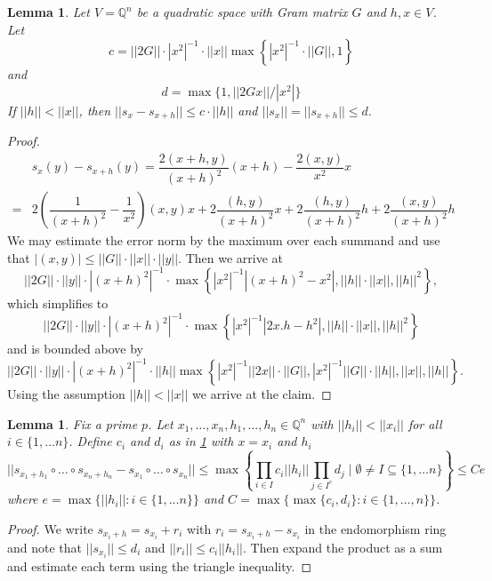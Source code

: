 \documentclass[11pt,letterpaper]{amsart}
\newcommand{\QQ}{\mathbb{Q}}
\newtheorem{lemma}[theorem]{Lemma}
\theoremstyle{definition}
\theoremstyle{remark}
\begin{document}
\begin{lemma}\label{lem:error}
Let $V=\QQ^n$ be a quadratic space with Gram matrix $G$ and $h,x \in V$.
Let
\[ c = ||2G|| \cdot  |x^2|^{-1} \cdot ||x|| \max \left\{ |x^2|^{-1} \cdot ||G||, 1\right\}\]
and 
\[d = \max\{1,  ||2 G x|| /|x^2|\}\]
If $||h|| < ||x||$, then 
$ || s_x - s_{x+h}|| \leq c \cdot ||h||$
and 
\(||s_x|| = ||s_{x+h}|| \leq d. \)
\end{lemma}
\begin{proof}
\[\begin{array}{ll}
    & s_{x}(y) - s_{x+h}(y) = \dfrac{2 (x+h,y)}{(x+h)^2}(x+h) - \dfrac{2 (x,y)}{x^2}x\\[15pt]
    =& 2\left(\dfrac{1}{(x+h)^2}-\dfrac{1}{x^2} \right)(x,y) x
     + 2\dfrac{(h,y)}{(x+h)^2}x    + 2\dfrac{(h,y)}{(x+h)^2}h
     + 2\dfrac{(x,y)}{(x+h)^2}h 
\end{array}\]
We may estimate the error norm by the maximum over each summand and use that $|(x,y)|\leq ||G|| \cdot ||x|| \cdot ||y||$. 
Then we arrive at 
\[||2G|| \cdot ||y|| \cdot  |(x+h)^2|^{-1} \cdot \max \left\{ |x^2|^{-1}|(x+h)^2 - x^2| , ||h|| \cdot ||x|| , ||h||^2\right\},\]
which simplifies to
\[||2G|| \cdot ||y|| \cdot  |(x+h)^2|^{-1} \cdot \max \left\{ |x^2|^{-1}|2x.h - h^2| , ||h|| \cdot ||x|| , ||h||^2\right\}\]
and is bounded above by
\[||2G|| \cdot ||y|| \cdot  |(x+h)^2|^{-1} \cdot ||h|| \max \left\{ |x^2|^{-1}||2x|| \cdot ||G||, |x^2|^{-1} ||G|| \cdot ||h|| , ||x|| , ||h||\right\}.\]
Using the assumption $||h|| < ||x||$ we arrive at the claim.
\end{proof}
\begin{lemma}
Fix a prime $p$. Let $x_1,\dots, x_n, h_1,\dots, h_n  \in \QQ^n$ with $||h_i|| < ||x_i||$ for all $i \in \{1,\dots n \}$.
Define $c_i$ and $d_i$ as in \cref{lem:error} with $x=x_i$ and $h_i$
\[|| s_{x_1+h_1} \circ \dots \circ s_{x_n+h_n} - s_{x_1}\circ \dots \circ s_{x_n}|| \leq  \max\left\{ \prod_{i \in I} c_i ||h_i|| \prod_{j \in I^c} d_j \mid \emptyset \neq I \subseteq \{1,\dots n\}\right\} \leq Ce \]
where $e = \max\{||h_i|| : i \in \{1,\dots n\}\}$ 
and $C = \max\{\max\{c_i, d_i\} : i \in \{1,\dots , n\}\}$.
\end{lemma}
\begin{proof}
We write $s_{x_i+h} = s_{x_i}+r_i$ with $r_i = s_{x_i+h}-s_{x_i}$ in the endomorphism ring and note that $||s_{x_i}|| \leq d_i$ and $||r_i|| \leq c_i ||h_i||$. Then expand the product as a sum and estimate each term using the triangle inequality.  
\end{proof}
\end{document}
